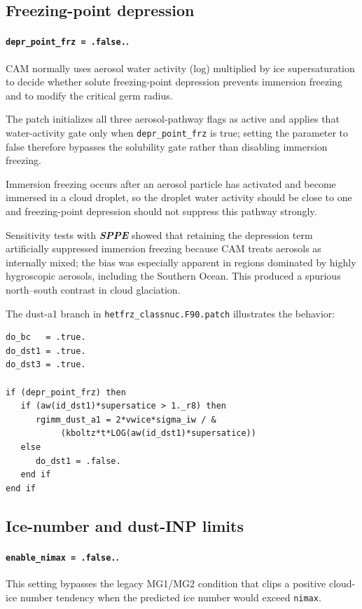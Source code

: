 \subsection*{Freezing-point depression}

\paragraph*{\texttt{depr\_point\_frz = .false.}.}
CAM normally uses aerosol water activity (log) multiplied by ice supersaturation to decide whether solute freezing-point depression prevents immersion freezing and to modify the critical germ radius.

The patch initializes all three aerosol-pathway flags as active and applies that water-activity gate only when \texttt{depr\_point\_frz} is true; setting the parameter to false therefore bypasses the solubility gate rather than disabling immersion freezing.

Immersion freezing occurs after an aerosol particle has activated and become immersed in a cloud droplet, so the droplet water activity should be close to one and freezing-point depression should not suppress this pathway strongly.

Sensitivity tests with \textbf{\textit{SPPE}} showed that retaining the depression term artificially suppressed immersion freezing because CAM treats aerosols as internally mixed; the bias was especially apparent in regions dominated by highly hygroscopic aerosols, including the Southern Ocean. This produced a spurious north--south contrast in cloud glaciation.

The dust-a1 branch in \texttt{hetfrz\_classnuc.F90.patch} illustrates the behavior:

\begin{verbatim}
do_bc   = .true.
do_dst1 = .true.
do_dst3 = .true.

if (depr_point_frz) then
   if (aw(id_dst1)*supersatice > 1._r8) then
      rgimm_dust_a1 = 2*vwice*sigma_iw / &
           (kboltz*t*LOG(aw(id_dst1)*supersatice))
   else
      do_dst1 = .false.
   end if
end if
\end{verbatim}

\subsection*{Ice-number and dust-INP limits}

\paragraph*{\texttt{enable\_nimax = .false.}.}
This setting bypasses the legacy MG1/MG2 condition that clips a positive cloud-ice number tendency when the predicted ice number would exceed \texttt{nimax}.


